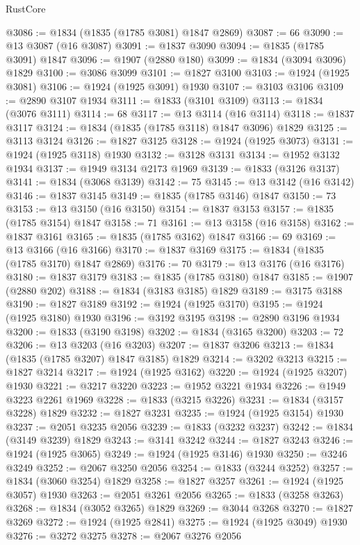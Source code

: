 \begin{lexlean}{RustCore}
\begin{coremodule}
@3086 := @1834 (@1835 (@1785 @3081) @1847 @2869)
@3087 := 66
@3090 := @13 @3087 (@16 @3087)
@3091 := @1837 @3090
@3094 := @1835 (@1785 @3091) @1847
@3096 := @1907 (@2880 @180)
@3099 := @1834 (@3094 @3096) @1829
@3100 := @3086 @3099
@3101 := @1827 @3100
@3103 := @1924 (@1925 @3081)
@3106 := @1924 (@1925 @3091) @1930
@3107 := @3103 @3106
@3109 := @2890 @3107 @1934
@3111 := @1833 (@3101 @3109)
@3113 := @1834 (@3076 @3111)
@3114 := 68
@3117 := @13 @3114 (@16 @3114)
@3118 := @1837 @3117
@3124 := @1834 (@1835 (@1785 @3118) @1847 @3096) @1829
@3125 := @3113 @3124
@3126 := @1827 @3125
@3128 := @1924 (@1925 @3073)
@3131 := @1924 (@1925 @3118) @1930
@3132 := @3128 @3131
@3134 := @1952 @3132 @1934
@3137 := @1949 @3134 @2173 @1969
@3139 := @1833 (@3126 @3137)
@3141 := @1834 (@3068 @3139)
@3142 := 75
@3145 := @13 @3142 (@16 @3142)
@3146 := @1837 @3145
@3149 := @1835 (@1785 @3146) @1847
@3150 := 73
@3153 := @13 @3150 (@16 @3150)
@3154 := @1837 @3153
@3157 := @1835 (@1785 @3154) @1847
@3158 := 71
@3161 := @13 @3158 (@16 @3158)
@3162 := @1837 @3161
@3165 := @1835 (@1785 @3162) @1847
@3166 := 69
@3169 := @13 @3166 (@16 @3166)
@3170 := @1837 @3169
@3175 := @1834 (@1835 (@1785 @3170) @1847 @2869)
@3176 := 70
@3179 := @13 @3176 (@16 @3176)
@3180 := @1837 @3179
@3183 := @1835 (@1785 @3180) @1847
@3185 := @1907 (@2880 @202)
@3188 := @1834 (@3183 @3185) @1829
@3189 := @3175 @3188
@3190 := @1827 @3189
@3192 := @1924 (@1925 @3170)
@3195 := @1924 (@1925 @3180) @1930
@3196 := @3192 @3195
@3198 := @2890 @3196 @1934
@3200 := @1833 (@3190 @3198)
@3202 := @1834 (@3165 @3200)
@3203 := 72
@3206 := @13 @3203 (@16 @3203)
@3207 := @1837 @3206
@3213 := @1834 (@1835 (@1785 @3207) @1847 @3185) @1829
@3214 := @3202 @3213
@3215 := @1827 @3214
@3217 := @1924 (@1925 @3162)
@3220 := @1924 (@1925 @3207) @1930
@3221 := @3217 @3220
@3223 := @1952 @3221 @1934
@3226 := @1949 @3223 @2261 @1969
@3228 := @1833 (@3215 @3226)
@3231 := @1834 (@3157 @3228) @1829
@3232 := @1827 @3231
@3235 := @1924 (@1925 @3154) @1930
@3237 := @2051 @3235 @2056
@3239 := @1833 (@3232 @3237)
@3242 := @1834 (@3149 @3239) @1829
@3243 := @3141 @3242
@3244 := @1827 @3243
@3246 := @1924 (@1925 @3065)
@3249 := @1924 (@1925 @3146) @1930
@3250 := @3246 @3249
@3252 := @2067 @3250 @2056
@3254 := @1833 (@3244 @3252)
@3257 := @1834 (@3060 @3254) @1829
@3258 := @1827 @3257
@3261 := @1924 (@1925 @3057) @1930
@3263 := @2051 @3261 @2056
@3265 := @1833 (@3258 @3263)
@3268 := @1834 (@3052 @3265) @1829
@3269 := @3044 @3268
@3270 := @1827 @3269
@3272 := @1924 (@1925 @2841)
@3275 := @1924 (@1925 @3049) @1930
@3276 := @3272 @3275
@3278 := @2067 @3276 @2056

\end{coremodule}
\end{lexlean}
